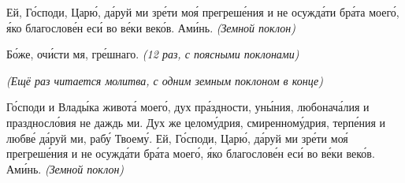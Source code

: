 Ей, Го́споди, Царю́, да́руй ми зре́ти моя́ прегреше́ния и не осужда́ти бра́та моего́, я́ко благослове́н еси́ во ве́ки веко́в. Ами́нь. \itshape (Земной поклон)\normalfont{}


Бо́же, очи́сти мя, гре́шнаго. \itshape (12 раз, с поясными поклонами)\normalfont{}


\itshape (Ещё раз читается молитва, с одним земным поклоном в конце)\normalfont{}


Го́споди и Влады́ка живота́ моего́, дух пра́здности, уны́ния, любонача́лия и праздносло́вия не даждь ми. Дух же целому́дрия, смиренному́дрия, терпе́ния и любве́ да́руй ми, рабу́ Твоему́. Ей, Го́споди, Царю́, да́руй ми зре́ти моя́ прегреше́ния и не осужда́ти бра́та моего́, я́ко благослове́н еси́ во ве́ки веко́в. Ами́нь. \itshape (Земной поклон)\normalfont{}


\mychapterending